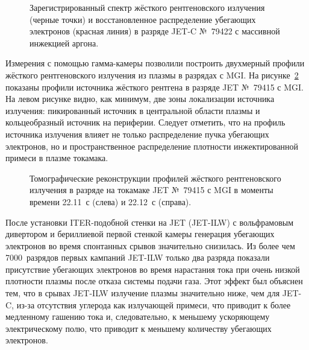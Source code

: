 \begin{figure}[ht!]
  \caption{ Зарегистрированный спектр жёсткого рентгеновского излучения (черные точки) и восстановленное распределение убегающих электронов (красная линия) в разряде JET-C №~79422 с массивной инжекцией аргона.~\cite{Plyusnin2012Fec} }
  \label{fig:jetRunawayEdf79422}
\end{figure}

Измерения с помощью гамма-камеры позволили построить двухмерный профили жёсткого рентгеновского излучения из плазмы в разрядах с MGI. На рисунке~\ref{fig:jetPulseTomography79415} показаны профили источника жёсткого рентгена в разряде JET №~79415 с MGI. На левом рисунке видно, как минимум, две зоны локализации источника излучения: пикированный источник в центральной области плазмы и кольцеобразный источник на периферии. Следует отметить, что на профиль источника излучения влияет не только распределение пучка убегающих электронов, но и пространственное распределение плотности инжектированной примеси в плазме токамака.~\cite{Shevelev2014}

\begin{figure}[ht!]
  \caption{Томографические реконструкции профилей жёсткого рентгеновского излучения в разряде на токамаке JET №~79415 с MGI в моменты времени 22.11~с (слева) и 22.12~с (справа).~\cite{Shevelev2014} }
  \label{fig:jetPulseTomography79415}
\end{figure}

После установки ITER-подобной стенки на JET (JET-ILW) с вольфрамовым дивертором и бериллиевой первой стенкой камеры генерация убегающих электронов во время спонтанных срывов значительно снизилась. Из более чем 7000~разрядов первых кампаний JET-ILW только два разряда показали присутствие убегающих электронов во время нарастания тока при очень низкой плотности плазмы после отказа системы подачи газа. Этот эффект был объяснен тем, что в срывах JET-ILW излучение плазмы значительно ниже, чем для JET-C, из-за отсутствия углерода как излучающей примеси, что приводит к более медленному гашению тока и, следовательно, к меньшему ускоряющему электрическому полю, что приводит к меньшему количеству убегающих электронов.~\cite{Reux2015_Mit}

